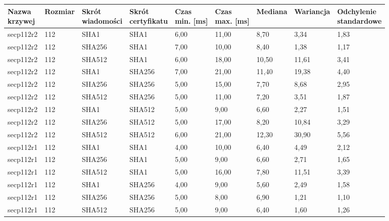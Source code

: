 \begin{longtable}{| l | l | l | l | l |l |l |l |l |}
\hline
\parbox[t]{25mm}{\centering Nazwa\\ krzywej} & \parbox[t]{10mm}{\centering Rozmiar} & \parbox[t]{15mm}{\centering Skrót\\ wiadomości} & \parbox[t]{2cm}{\centering Skrót\\ certyfikatu} &  \parbox[t]{10mm}{\centering Czas\\  min. [ms]} & \parbox[t]{10mm}{\centering Czas\\ max. [ms]}  & \parbox[t]{2cm}{\centering Mediana} & \parbox[t]{2cm}{\centering Wariancja} & \parbox[t]{30mm}{\centering Odchylenie\\ standardowe} \\ \hline 
\endhead
secp112r2 & 112 & SHA1 & SHA1 & 6,00 & 11,00 & 8,70 & 3,34 & 1,83 \\ \hline 
secp112r2 & 112 & SHA256 & SHA1 & 7,00 & 10,00 & 8,40 & 1,38 & 1,17 \\ \hline 
secp112r2 & 112 & SHA512 & SHA1 & 6,00 & 18,00 & 10,50 & 11,61 & 3,41 \\ \hline 
secp112r2 & 112 & SHA1 & SHA256 & 7,00 & 21,00 & 11,40 & 19,38 & 4,40 \\ \hline 
secp112r2 & 112 & SHA256 & SHA256 & 5,00 & 15,00 & 7,70 & 8,68 & 2,95 \\ \hline 
secp112r2 & 112 & SHA512 & SHA256 & 5,00 & 11,00 & 7,20 & 3,51 & 1,87 \\ \hline 
secp112r2 & 112 & SHA1 & SHA512 & 5,00 & 9,00 & 6,60 & 2,27 & 1,51 \\ \hline 
secp112r2 & 112 & SHA256 & SHA512 & 5,00 & 17,00 & 8,20 & 10,84 & 3,29 \\ \hline 
secp112r2 & 112 & SHA512 & SHA512 & 6,00 & 21,00 & 12,30 & 30,90 & 5,56 \\ \hline 
secp112r1 & 112 & SHA1 & SHA1 & 4,00 & 10,00 & 6,40 & 4,49 & 2,12 \\ \hline 
secp112r1 & 112 & SHA256 & SHA1 & 5,00 & 9,00 & 6,60 & 2,71 & 1,65 \\ \hline 
secp112r1 & 112 & SHA512 & SHA1 & 5,00 & 16,00 & 7,80 & 11,51 & 3,39 \\ \hline 
secp112r1 & 112 & SHA1 & SHA256 & 4,00 & 9,00 & 5,60 & 2,49 & 1,58 \\ \hline 
secp112r1 & 112 & SHA256 & SHA256 & 5,00 & 8,00 & 6,90 & 1,21 & 1,10 \\ \hline 
secp112r1 & 112 & SHA512 & SHA256 & 5,00 & 9,00 & 6,40 & 1,60 & 1,26 \\ \hline 

\end{longtable}
